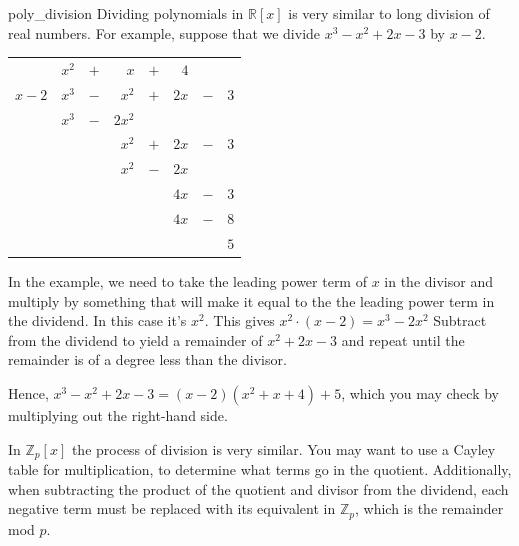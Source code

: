 \begin{example}{poly_division} 
Dividing polynomials in $\mathbb{R}[x]$ is very similar to long division of real numbers.  
 For example,
suppose that we divide $x^3 - x^2 + 2 x - 3$ by $x - 2$.  
\begin{center}
\begin{tabular}{rrcrcrcr}
        &  $x^2$  &  $+$  &      $x$  &  $+$  &    $4$  &       &       \\ \cline{2-8}
 \multicolumn{1}{r|}{$x - 2$}
        &  $x^3$  &  $-$  &    $x^2$  &  $+$  &  $2 x$  &  $-$  &  $3$  \\
        &  $x^3$  &  $-$  &  $2 x^2$  &       &         &       &       \\ \cline{2-8}
        &         &       &    $x^2$  &  $+$  &  $2 x$  &  $-$  &  $3$  \\
        &         &       &    $x^2$  &  $-$  &  $2 x$  &       &       \\ \cline{4-8}
        &         &       &           &       &  $4 x$  &  $-$  &  $3$  \\
        &         &       &           &       &  $4 x$  &  $-$  &  $8$  \\ \cline{6-8}
        &         &       &           &       &         &       &  $5$
\end{tabular}
\end{center}
In the example, we need to take the leading power term of $x$ in the divisor and multiply by something that will make it equal to the the leading power term in the dividend.  In this case it's $x^2$.  This gives $x^2\cdot(x-2) = x^3 - 2x^2$  Subtract from the dividend to yield a remainder of $x^2 + 2x - 3$ and repeat until the remainder is of a degree less than the divisor.
 
Hence, $x^3 - x^2 + 2 x - 3 = (x - 2) (x^2 + x + 4 ) + 5$, which you may check by multiplying out the right-hand side.
\end{example}
In $\mathbb{Z}_p[x]$ the process of division is very similar. You may want to use a Cayley table for multiplication, to determine what terms go in the quotient.  Additionally, when subtracting the product of the quotient and divisor from the dividend, each negative term must be replaced with its equivalent in $\mathbb{Z}_p$, which is the remainder mod $p$.

